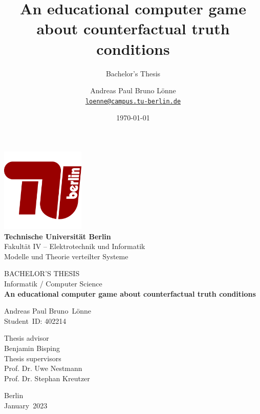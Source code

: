 \documentclass[a4paper,american,10pt]{paper}
\date{\today}
\newcommand{\dctitle}{An educational computer game about counterfactual truth conditions}
\newcommand{\authorlastname}{Lönne}
\newcommand{\authorfirstname}{Andreas Paul Bruno}
\newcommand{\place}{Berlin}
\newcommand{\uni}{Technische Universität \place}
\newcommand{\depart}{Fakultät IV -- Elektrotechnik und Informatik}
\providecommand*{\code}[1]{\texttt{#1}}
\theoremstyle{definition}\newtheorem{lemma}[thm]{Lemma}
\theoremstyle{definition}\newtheorem{proposition}[thm]{Proposition}
\theoremstyle{definition}\newtheorem{corollary}[thm]{Corollary}
\theoremstyle{definition}\newtheorem{definition}{Definition}
\begin{document}
\title{\dctitle}

\subtitle{Bachelor's Thesis}

\author{%
	Andreas Paul Bruno Lönne\\
	\code{\href{mailto:loenne@campus.tu-berlin.de}{loenne@campus.tu-berlin.de}}
}


\begin{titlepage}
 \begin{center}
  \includegraphics[width=4cm]{TU-Berlin-01}\\
  \large
  \textbf{\uni}\\
  \depart\\
  Modelle und Theorie verteilter Systeme\\
  \vspace{2.5cm}
  
  \Large BACHELOR'S THESIS\\
  \small Informatik / Computer Science\\
  \vspace{0.5cm}
  \LARGE \textbf{\dctitle}\\
  \vspace{0.6cm}
  
  \large \authorfirstname~\authorlastname\\
  Student~ID: 402214\\
  \vspace*{\fill}
  
  \small Thesis advisor\\
  \large Benjamin Bisping\\
  \vspace{0.5cm}
  \small Thesis supervisors\\
  \large Prof. Dr. Uwe Nestmann\\
  Prof. Dr. Stephan Kreutzer\\
  \vspace{1.5cm}

  \normalsize  
  \place\\
  January~2023
 \end{center}	
\end{titlepage}
\end{document}

